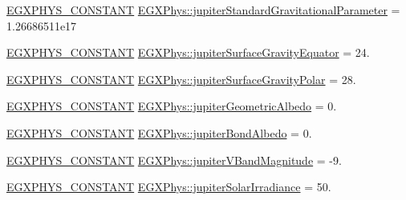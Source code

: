 \begin{DoxyCompactItemize}
\item 
\mbox{\hyperlink{group___e_g_x_phys-_constants-_macros_ga76980d288494ce1714c9ac68a95ba702}{E\+G\+X\+P\+H\+Y\+S\+\_\+\+C\+O\+N\+S\+T\+A\+NT}} \mbox{\hyperlink{group___e_g_x_phys-_constants-_astrophysics-_solar_system-_jupiter-_bulk_ga3739c2ca3ea3a5dcbeae071e7e32dc9c}{E\+G\+X\+Phys\+::jupiter\+Standard\+Gravitational\+Parameter}} = 1.\+26686511e17
\item 
\mbox{\hyperlink{group___e_g_x_phys-_constants-_macros_ga76980d288494ce1714c9ac68a95ba702}{E\+G\+X\+P\+H\+Y\+S\+\_\+\+C\+O\+N\+S\+T\+A\+NT}} \mbox{\hyperlink{group___e_g_x_phys-_constants-_astrophysics-_solar_system-_jupiter-_bulk_ga453ce834b062055a91b1fd594428fa6c}{E\+G\+X\+Phys\+::jupiter\+Surface\+Gravity\+Equator}} = 24.
\item 
\mbox{\hyperlink{group___e_g_x_phys-_constants-_macros_ga76980d288494ce1714c9ac68a95ba702}{E\+G\+X\+P\+H\+Y\+S\+\_\+\+C\+O\+N\+S\+T\+A\+NT}} \mbox{\hyperlink{group___e_g_x_phys-_constants-_astrophysics-_solar_system-_jupiter-_bulk_ga43cd8191d01a0990fd9104a4521b981b}{E\+G\+X\+Phys\+::jupiter\+Surface\+Gravity\+Polar}} = 28.
\item 
\mbox{\hyperlink{group___e_g_x_phys-_constants-_macros_ga76980d288494ce1714c9ac68a95ba702}{E\+G\+X\+P\+H\+Y\+S\+\_\+\+C\+O\+N\+S\+T\+A\+NT}} \mbox{\hyperlink{group___e_g_x_phys-_constants-_astrophysics-_solar_system-_jupiter-_bulk_ga8ca933493ff89584bc50b7e5bcbb64b2}{E\+G\+X\+Phys\+::jupiter\+Geometric\+Albedo}} = 0.
\item 
\mbox{\hyperlink{group___e_g_x_phys-_constants-_macros_ga76980d288494ce1714c9ac68a95ba702}{E\+G\+X\+P\+H\+Y\+S\+\_\+\+C\+O\+N\+S\+T\+A\+NT}} \mbox{\hyperlink{group___e_g_x_phys-_constants-_astrophysics-_solar_system-_jupiter-_bulk_ga874898a1cbfefdbef696c7043cfc722e}{E\+G\+X\+Phys\+::jupiter\+Bond\+Albedo}} = 0.
\item 
\mbox{\hyperlink{group___e_g_x_phys-_constants-_macros_ga76980d288494ce1714c9ac68a95ba702}{E\+G\+X\+P\+H\+Y\+S\+\_\+\+C\+O\+N\+S\+T\+A\+NT}} \mbox{\hyperlink{group___e_g_x_phys-_constants-_astrophysics-_solar_system-_jupiter-_bulk_ga58ab15a15b0a0512da0f1adae198ec69}{E\+G\+X\+Phys\+::jupiter\+V\+Band\+Magnitude}} = -\/9.
\item 
\mbox{\hyperlink{group___e_g_x_phys-_constants-_macros_ga76980d288494ce1714c9ac68a95ba702}{E\+G\+X\+P\+H\+Y\+S\+\_\+\+C\+O\+N\+S\+T\+A\+NT}} \mbox{\hyperlink{group___e_g_x_phys-_constants-_astrophysics-_solar_system-_jupiter-_bulk_gaba342d5906a24c551ea5c3328b536b29}{E\+G\+X\+Phys\+::jupiter\+Solar\+Irradiance}} = 50.

\end{DoxyCompactItemize}
